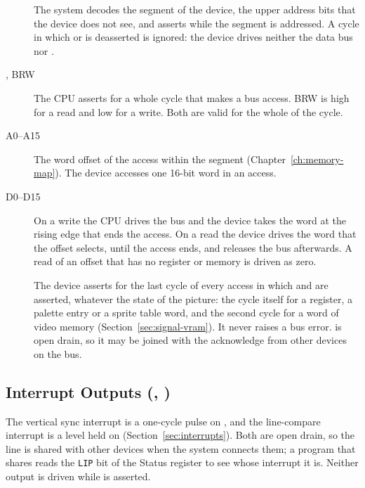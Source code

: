 \begin{description}
	\item[] The system decodes the segment of the device, the upper address bits that the device does not see, and
	      asserts  while the segment is addressed. A cycle in which  or  is
	      deasserted is ignored: the device drives neither the data bus nor .
	\item[, BRW] The CPU asserts  for a whole cycle that makes a bus access. BRW is high for a
	      read and low for a write. Both are valid for the whole of the cycle.
	\item[A0--A15] The word offset of the access within the segment (Chapter~\ref{ch:memory-map}). The device accesses one 16-bit
	      word in an access.
	\item[D0--D15] On a write the CPU drives the bus and the device takes the word at the rising edge that ends the access. On a
	      read the device drives the word that the offset selects, until the access ends, and releases the bus afterwards. A read
	      of an offset that has no register or memory is driven as zero.
	\item[] The device asserts  for the last cycle of every access in which  and
	       are asserted, whatever the state of the picture: the cycle itself for a register, a palette entry or a
	      sprite table word, and the second cycle for a word of video memory (Section~\ref{sec:signal-vram}). It never raises a
	      bus error.  is open drain, so it may be joined with the acknowledge from other devices on the bus.
\end{description}

\subsection{Interrupt Outputs (, )}

The vertical sync interrupt is a one-cycle pulse on , and the line-compare interrupt is a level held on
 (Section~\ref{sec:interrupts}). Both are open drain, so the line is shared with other devices when the
system connects them; a program that shares  reads the \texttt{LIP} bit of the Status register to see
whose interrupt it is. Neither output is driven while  is asserted.

